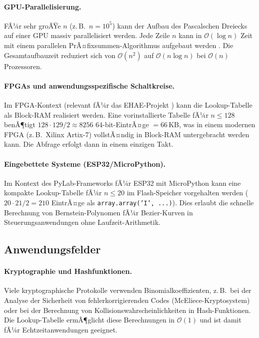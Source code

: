 ﻿\documentclass[12pt, a4paper]{article}
\newcommand{\Oh}{\mathcal{O}}
\theoremstyle{plain}
\theoremstyle{definition}
\theoremstyle{remark}
\renewcommand{\Oh}{\mathcal{O}}
\begin{document}
\paragraph{GPU-Parallelisierung.}
FÃ¼r sehr groÃŸe $n$ (z.\,B.\ $n = 10^5$) kann der Aufbau des
Pascalschen Dreiecks auf einer GPU massiv parallelisiert werden.
Jede Zeile $n$ kann in $\Oh(\log n)$ Zeit mit einem parallelen
PrÃ¤fixsummen-Algorithmus aufgebaut werden \cite{ladner1980parallel}.
Die Gesamtaufbauzeit reduziert sich von $\Oh(n^2)$ auf $\Oh(n \log n)$
bei $\Oh(n)$ Prozessoren.

\paragraph{FPGAs und anwendungsspezifische Schaltkreise.}
Im FPGA-Kontext (relevant fÃ¼r das EHAE-Projekt \cite{epp2026ehae})
kann die Lookup-Tabelle als Block-RAM realisiert werden. Eine
vorinstallierte Tabelle fÃ¼r $n \le 128$ benÃ¶tigt
$128 \cdot 129 / 2 \approx 8256$ 64-bit-EintrÃ¤ge $= 66\,\text{KB}$,
was in einem modernen FPGA (z.\,B.\ Xilinx Artix-7) vollstÃ¤ndig
in Block-RAM untergebracht werden kann. Die Abfrage erfolgt dann in
einem einzigen Takt.

\paragraph{Eingebettete Systeme (ESP32/MicroPython).}
Im Kontext des PyLab-Frameworks \cite{epp2026pylab} fÃ¼r ESP32 mit
MicroPython kann eine kompakte Lookup-Tabelle fÃ¼r $n \le 20$ im
Flash-Speicher vorgehalten werden ($20 \cdot 21 / 2 = 210$ EintrÃ¤ge
als \texttt{array.array('I', ...)}). Dies erlaubt die schnelle
Berechnung von Bernstein-Polynomen fÃ¼r Bezier-Kurven in
Steuerungsanwendungen ohne Laufzeit-Arithmetik.

\subsection{Anwendungsfelder}

\paragraph{Kryptographie und Hashfunktionen.}
Viele kryptographische Protokolle verwenden Binomialkoeffizienten,
z.\,B.\ bei der Analyse der Sicherheit von fehlerkorrigierenden Codes
(McEliece-Kryptosystem) oder bei der Berechnung von Kollisionswahrscheinlichkeiten
in Hash-Funktionen. Die Lookup-Tabelle ermÃ¶glicht diese Berechnungen
in $\Oh(1)$ und ist damit fÃ¼r Echtzeitanwendungen geeignet.
\end{document}
